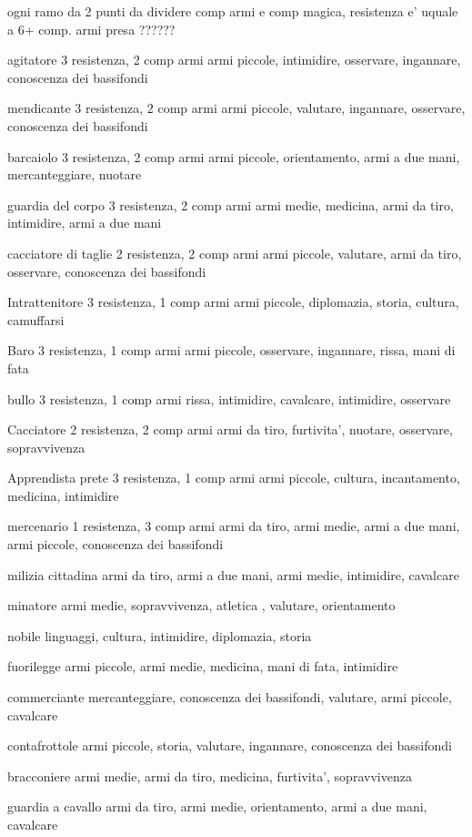 \documentclass[12pt,a4paper,twoside,openany,twocolumn]{book}
\begin{document}
ogni ramo da 2 punti da dividere comp armi e comp magica, resistenza e' uquale a 6+ comp. armi presa ??????


agitatore  3 resistenza, 2 comp armi
armi piccole, intimidire, osservare, ingannare, conoscenza dei bassifondi

mendicante 3 resistenza, 2 comp armi
armi piccole, valutare, ingannare, osservare, conoscenza dei bassifondi

barcaiolo 3 resistenza, 2 comp armi
armi piccole, orientamento, armi a due mani,  mercanteggiare, nuotare

guardia del corpo 3 resistenza, 2 comp armi
armi medie, medicina, armi da tiro, intimidire, armi a due mani

cacciatore di taglie 2 resistenza, 2 comp armi
armi piccole, valutare, armi da tiro, osservare, conoscenza dei bassifondi

Intrattenitore 3 resistenza, 1 comp armi
armi piccole, diplomazia, storia, cultura, camuffarsi

Baro 3 resistenza, 1 comp armi
armi piccole, osservare, ingannare, rissa, mani di fata

bullo 3 resistenza, 1 comp armi
rissa, intimidire, cavalcare, intimidire,  osservare

Cacciatore 2 resistenza, 2 comp armi
armi da tiro, furtivita', nuotare,  osservare, sopravvivenza

Apprendista prete 3 resistenza, 1 comp armi
armi piccole, cultura, incantamento, medicina, intimidire

mercenario 1 resistenza, 3 comp armi
armi da tiro, armi medie, armi a due mani, armi piccole, conoscenza dei bassifondi

milizia cittadina  
armi da tiro, armi a due mani, armi medie, intimidire, cavalcare

minatore
armi medie, sopravvivenza, atletica , valutare, orientamento

nobile
linguaggi, cultura, intimidire,  diplomazia, storia

fuorilegge
armi piccole, armi medie, medicina, mani di fata, intimidire

commerciante
mercanteggiare, conoscenza dei bassifondi, valutare, armi piccole, cavalcare

contafrottole
armi piccole, storia, valutare, ingannare, conoscenza dei bassifondi

bracconiere
armi medie, armi da tiro, medicina, furtivita', sopravvivenza

guardia a cavallo
armi da tiro, armi medie, orientamento, armi a due mani, cavalcare
\end{document}
